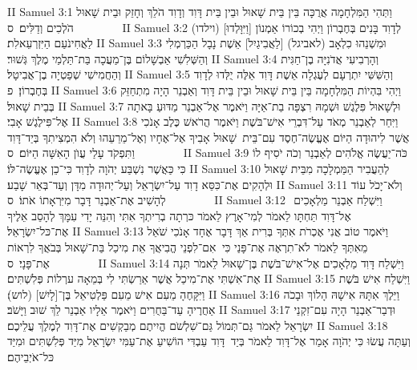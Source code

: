 II Samuel 3:1	וַתְּהִי הַמִּלְחָמָה אֲרֻכָּה בֵּין בֵּית שָׁאוּל וּבֵין בֵּית דָּוִד וְדָוִד הֹלֵךְ וְחָזֵק וּבֵית שָׁאוּל הֹלְכִים וְדַלִּים׃ {ס}        
II Samuel 3:2	(וילדו) [וַיִּוָּלְדוּ] לְדָוִד בָּנִים בְּחֶבְרוֹן וַיְהִי בְכוֹרוֹ אַמְנוֹן לַאֲחִינֹעַם הַיִּזְרְעֵאלִת׃
II Samuel 3:3	וּמִשְׁנֵהוּ כִלְאָב (לאביגל) [לַאֲבִיגַיִל] אֵשֶׁת נָבָל הַכַּרְמְלִי וְהַשְּׁלִשִׁי אַבְשָׁלוֹם בֶּן־מַעֲכָה בַּת־תַּלְמַי מֶלֶךְ גְּשׁוּר׃
II Samuel 3:4	וְהָרְבִיעִי אֲדֹנִיָּה בֶן־חַגִּית וְהַחֲמִישִׁי שְׁפַטְיָה בֶן־אֲבִיטָל׃
II Samuel 3:5	וְהַשִּׁשִּׁי יִתְרְעָם לְעֶגְלָה אֵשֶׁת דָּוִד אֵלֶּה יֻלְּדוּ לְדָוִד בְּחֶבְרוֹן׃ {פ}
II Samuel 3:6	וַיְהִי בִּהְיוֹת הַמִּלְחָמָה בֵּין בֵּית שָׁאוּל וּבֵין בֵּית דָּוִד וְאַבְנֵר הָיָה מִתְחַזֵּק בְּבֵית שָׁאוּל׃
II Samuel 3:7	וּלְשָׁאוּל פִּלֶגֶשׁ וּשְׁמָהּ רִצְפָּה בַת־אַיָּה וַיֹּאמֶר אֶל־אַבְנֵר מַדּוּעַ בָּאתָה אֶל־פִּילֶגֶשׁ אָבִי׃
II Samuel 3:8	וַיִּחַר לְאַבְנֵר מְאֹד עַל־דִּבְרֵי אִישׁ־בֹּשֶׁת וַיֹּאמֶר הֲרֹאשׁ כֶּלֶב אָנֹכִי אֲשֶׁר לִיהוּדָה הַיּוֹם אֶעֱשֶׂה־חֶסֶד עִם־בֵּית  שָׁאוּל אָבִיךָ אֶל־אֶחָיו וְאֶל־מֵרֵעֵהוּ וְלֹא הִמְצִיתִךָ בְּיַד־דָּוִד וַתִּפְקֹד עָלַי עֲוֺן הָאִשָּׁה הַיּוֹם׃ {ס}        
II Samuel 3:9	כֹּה־יַעֲשֶׂה אֱלֹהִים לְאַבְנֵר וְכֹה יֹסִיף לוֹ כִּי כַּאֲשֶׁר נִשְׁבַּע יְהֹוָה לְדָוִד כִּי־כֵן אֶעֱשֶׂה־לּוֹ׃
II Samuel 3:10	לְהַעֲבִיר הַמַּמְלָכָה מִבֵּית שָׁאוּל וּלְהָקִים אֶת־כִּסֵּא דָוִד עַל־יִשְׂרָאֵל וְעַל־יְהוּדָה מִדָּן וְעַד־בְּאֵר שָׁבַע׃
II Samuel 3:11	וְלֹא־יָכֹל עוֹד לְהָשִׁיב אֶת־אַבְנֵר דָּבָר מִיִּרְאָתוֹ אֹתוֹ׃ {ס}        
II Samuel 3:12	וַיִּשְׁלַח אַבְנֵר מַלְאָכִים  אֶל־דָּוִד תַּחְתָּו לֵאמֹר לְמִי־אָרֶץ לֵאמֹר כּרְתָה בְרִיתְךָ אִתִּי וְהִנֵּה יָדִי עִמָּךְ לְהָסֵב אֵלֶיךָ אֶת־כּל־יִשְׂרָאֵל׃
II Samuel 3:13	וַיֹּאמֶר טוֹב אֲנִי אֶכְרֹת אִתְּךָ בְּרִית אַךְ דָּבָר אֶחָד אָנֹכִי שֹׁאֵל מֵאִתְּךָ לֵאמֹר לֹא־תִרְאֶה אֶת־פָּנַי כִּי  אִם־לִפְנֵי הֱבִיאֲךָ אֵת מִיכַל בַּת־שָׁאוּל בְּבֹאֲךָ לִרְאוֹת אֶת־פָּנָי׃ {ס}        
II Samuel 3:14	וַיִּשְׁלַח דָּוִד מַלְאָכִים אֶל־אִישׁ־בֹּשֶׁת בֶּן־שָׁאוּל לֵאמֹר תְּנָה אֶת־אִשְׁתִּי אֶת־מִיכַל אֲשֶׁר אֵרַשְׂתִּי לִי בְּמֵאָה ערְלוֹת פְּלִשְׁתִּים׃
II Samuel 3:15	וַיִּשְׁלַח אִישׁ בֹּשֶׁת וַיִּקָּחֶהָ מֵעִם אִישׁ מֵעִם פַּלְטִיאֵל בֶּן־[לָיִשׁ] (לוש)׃
II Samuel 3:16	וַיֵּלֶךְ אִתָּהּ אִישָׁהּ הָלוֹךְ וּבָכֹה אַחֲרֶיהָ עַד־בַּחֻרִים וַיֹּאמֶר אֵלָיו אַבְנֵר לֵךְ שׁוּב וַיָּשֹׁב׃
II Samuel 3:17	וּדְבַר־אַבְנֵר הָיָה עִם־זִקְנֵי יִשְׂרָאֵל לֵאמֹר גַּם־תְּמוֹל גַּם־שִׁלְשֹׁם הֱיִיתֶם מְבַקְשִׁים אֶת־דָּוִד לְמֶלֶךְ עֲלֵיכֶם׃
II Samuel 3:18	וְעַתָּה עֲשׂוּ כִּי יְהֹוָה אָמַר אֶל־דָּוִד לֵאמֹר בְּיַד  דָּוִד עַבְדִּי הוֹשִׁיעַ אֶת־עַמִּי יִשְׂרָאֵל מִיַּד פְּלִשְׁתִּים וּמִיַּד כּל־אֹיְבֵיהֶם׃
